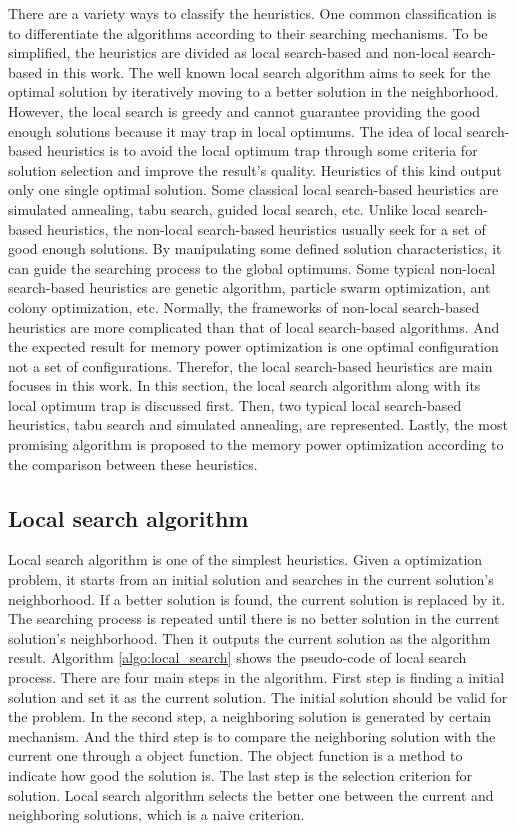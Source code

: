 	There are a variety ways to classify the heuristics. One common classification is to differentiate the algorithms
	according to their searching mechanisms. To be simplified, the heuristics are divided as local search-based and
	non-local search-based in this work. The well known local search algorithm aims to seek for the optimal solution by
	iteratively moving to a better solution in the neighborhood. However, the local search is greedy and cannot guarantee providing the good enough solutions because it may trap in local optimums. The idea of local search-based heuristics
	is to avoid the local optimum trap through some criteria for solution selection and improve the result's quality.
	Heuristics of this kind output only one single optimal solution. Some classical local search-based heuristics are simulated annealing, tabu search, guided local search, etc. Unlike local search-based heuristics, the non-local search-based heuristics usually seek for a set of good enough solutions. By manipulating some defined solution characteristics, it can guide the searching process to the global optimums. Some typical non-local search-based heuristics are genetic algorithm, particle swarm optimization, ant colony optimization, etc.
	Normally, the frameworks of non-local search-based heuristics are more complicated than that of local search-based algorithms. And the expected result for memory power optimization is one optimal configuration not a set of
	configurations. Therefor, the local search-based heuristics are main focuses in this work.
	In this section, the local search algorithm along with its local optimum trap is discussed first. Then, two typical
	local search-based heuristics, tabu search and simulated annealing, are represented. Lastly, the most promising algorithm 
	is proposed to the memory power optimization according to the comparison between these heuristics.
	
		\subsection{Local search algorithm}
		\label{subsec:local_search}
		Local search algorithm is one of the simplest heuristics. Given a optimization problem, it starts from an initial solution and searches in the current solution's neighborhood. If a better solution is found, the current solution is replaced by it. The searching process is repeated until there is no better solution in the current solution's neighborhood. Then it outputs the current solution as the algorithm result.
		Algorithm \ref{algo:local_search} shows the pseudo-code of local search process. There are four main steps in the algorithm. First step is finding a initial solution and set it as the current solution. The initial solution should be valid for the problem. In the second step, a neighboring solution is generated by certain mechanism. And the third step is to compare the neighboring solution with the current one through a object function. The object function is a method to indicate how good the solution is. The last step is the selection criterion for solution. Local search algorithm selects the better one between the current and neighboring solutions, which is a naive criterion.
		
